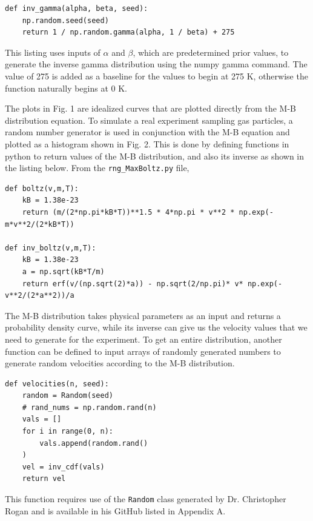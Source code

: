 \documentclass[%
 reprint,
 amsmath,amssymb,
 aps,
]{revtex4-2}
\begin{document}
\begin{lstlisting}
def inv_gamma(alpha, beta, seed):
    np.random.seed(seed)
    return 1 / np.random.gamma(alpha, 1 / beta) + 275
\end{lstlisting}

This listing uses inputs of $\alpha$ and $\beta$, which are predetermined prior values, to generate the inverse gamma distribution using the numpy gamma command. The value of 275 is added as a baseline for the values to begin at 275 K, otherwise the function naturally begins at 0 K. 


The plots in Fig. 1 are idealized curves that are plotted directly from the M-B distribution equation. To simulate a real experiment sampling gas particles, a random number generator is used in conjunction with the M-B equation and plotted as a histogram shown in Fig. 2. This is done by defining functions in python to return values of the M-B distribution, and also its inverse as shown in the listing below. From the \lstinline{rng_MaxBoltz.py} file,

\begin{lstlisting}
def boltz(v,m,T):
    kB = 1.38e-23
    return (m/(2*np.pi*kB*T))**1.5 * 4*np.pi * v**2 * np.exp(-m*v**2/(2*kB*T))

def inv_boltz(v,m,T):
    kB = 1.38e-23
    a = np.sqrt(kB*T/m)
    return erf(v/(np.sqrt(2)*a)) - np.sqrt(2/np.pi)* v* np.exp(-v**2/(2*a**2))/a
\end{lstlisting}
The M-B distribution takes physical parameters as an input and returns a probability density curve, while its inverse can give us the velocity values that we need to generate for the experiment. To get an entire distribution, another function can be defined to input arrays of randomly generated numbers to generate random velocities according to the M-B distribution.

\begin{lstlisting}
def velocities(n, seed):
    random = Random(seed)
    # rand_nums = np.random.rand(n)
    vals = []
    for i in range(0, n):
        vals.append(random.rand()
    )
    vel = inv_cdf(vals)
    return vel
\end{lstlisting}
This function requires use of the \lstinline{Random} class generated by Dr. Christopher Rogan and is available in his GitHub listed in Appendix A. 
\end{document}
